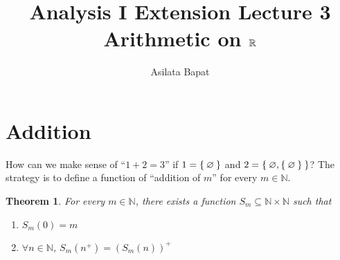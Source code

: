\documentclass[12pt]{amsart}
\title{Analysis I Extension Lecture 3\\Arithmetic on $\mathbb{R}$}
\author{Asilata Bapat}
\newcommand{\bbN}{\mathbb{N}}
\theoremstyle{plain}
\newtheorem*{thm}{Theorem}
\theoremstyle{remark}
\theoremstyle{definition}
\begin{document}
\maketitle
{}

\section*{Addition}
How can we make sense of ``$1+2 = 3$'' if $1 = \Set{\varnothing}$ and $2 = \Set{\varnothing, \Set{\varnothing}}$?
The strategy is to define a function of ``addition of $m$'' for every $m \in \bbN$. 

\begin{thm}
	For every $m \in \bbN$, there exists a function $S_m \subseteq \bbN \times \bbN$ such that 
	\begin{enumerate}[(1)]
		\item $S_m(0) = m$
		\item $\forall n \in \bbN$, $S_m(n^+) = (S_m(n))^+$
	\end{enumerate}
\end{thm}
\end{document}
